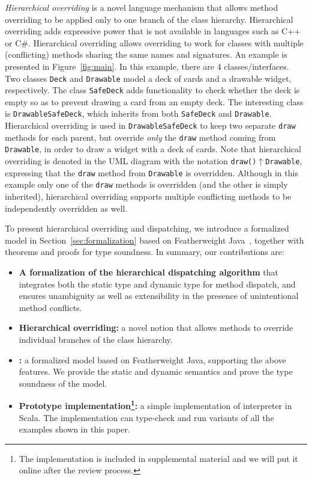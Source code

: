 \textit{Hierarchical overriding} is a novel language
mechanism that allows method overriding to be applied
only to one branch of the class hierarchy. Hierarchical overriding 
adds expressive power that is not available in languages such as 
C++ or C\#. Hierarchical overriding allows overriding to work 
for classes with multiple (conflicting) methods sharing the 
same names and signatures. An example is presented in 
Figure~\ref{fig:main}. In this example, there are 4 classes/interfaces.
Two classes \lstinline|Deck| and \lstinline|Drawable| model a deck of cards
 and a drawable widget, respectively. 
The class \lstinline|SafeDeck| adds functionality to check whether the
deck is empty so as to prevent drawing a card from an empty deck. 
The interesting class is \lstinline|DrawableSafeDeck|, which inherits 
from both \lstinline|SafeDeck| and \lstinline|Drawable|. Hierarchical
overriding is used in \lstinline|DrawableSafeDeck| to keep two separate \lstinline|draw|
methods for each parent, but override \emph{only} the \lstinline|draw|
method coming from \lstinline|Drawable|, in order to draw a widget
with a deck of cards. Note that hierarchical overriding is denoted in the UML
diagram with the notation
\lstinline|draw()|$\uparrow$\lstinline|Drawable|, expressing that the \lstinline|draw| method from \lstinline|Drawable|
is overridden. Although in this example only one of the
\lstinline|draw| methods is overridden (and the other is simply inherited), hierarchical overriding
supports multiple conflicting methods to be independently overridden as well.


To present hierarchical overriding and dispatching, we introduce a
formalized model \MIM{} in Section~\ref{sec:formalization} based on
Featherweight Java~\cite{Igarashi01FJ}, together with theorems and
proofs for type soundness. 
In summary, our contributions are:
\begin{itemize}
	\item \textbf{A formalization of the hierarchical dispatching algorithm} that integrates both the static type and dynamic type for method dispatch, and 
	ensures unambiguity as well as extensibility in the presence
        of unintentional method conflicts.
	\item \textbf{Hierarchical overriding:} a novel notion that allows
          methods to override individual branches of the class hierarchy.
	\item \textbf{\name:} a formalized model based on
          Featherweight Java, supporting the above features. 
          We provide the static and dynamic semantics and prove the
          type soundness of the model.
	\item \textbf{Prototype implementation\footnote{The implementation is included in supplemental material and we will put it online after the review process.}:} a
          simple implementation of \MIM{} interpreter in Scala. The implementation can type-check and run variants
          of all the examples shown in this paper.
\end{itemize}

 